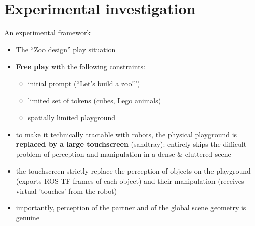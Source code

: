 \documentclass[handout,compress]{beamer}
\begin{document}

\section{Experimental investigation}


\begin{frame}{An experimental framework}

    \begin{itemize}
        \item The ``Zoo design'' play situation
        \item {\bf Free play} with the following constraints:
            \begin{itemize}
                \item initial prompt (``Let's build a zoo!'')
                \item limited set of tokens (cubes, Lego animals)
                \item spatially limited playground
            \end{itemize}
        \item<2-> to make it technically tractable with robots, the physical
            playground is {\bf replaced by a large touchscreen} (sandtray): entirely
            skips the difficult problem of perception and manipulation in a
            dense \& cluttered scene
        \item<2-> the touchscreen strictly
            replace the perception of objects on the playground (exports
            ROS TF frames of each object) and their manipulation (receives
            virtual 'touches' from the robot)
        \item<2-> importantly, perception of the partner and of the global scene
            geometry is genuine
    \end{itemize}
\end{frame}





\end{document}
